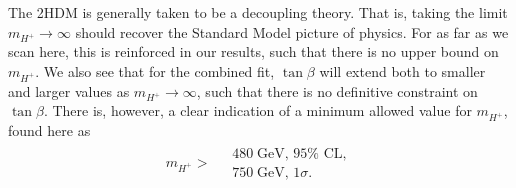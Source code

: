 \documentclass[a4paper,12pt]{article}
\begin{document}
The 2HDM is generally taken to be a decoupling theory. 
That is, taking the limit $m_{H^+} \to \infty$ should recover the Standard Model picture of physics.
For as far as we scan here, this is reinforced in our results, such that there is no upper bound on $m_{H^+}$. 
We also see that for the combined fit, $\tan\beta$ will extend both to smaller and larger values as $m_{H^+}\to\infty$, such that there is no definitive constraint on $\tan\beta$. 
There is, however, a clear indication of a minimum allowed value for $m_{H^+}$, found here as
\begin{align}
    \label{eq:const}
    m_{H^+} > \begin{split} &\; 480 \;\text{GeV},\, 95\% \text{ CL}, \\ &\; 750 \;\text{GeV},\, 1\sigma. \end{split}
\end{align}
\end{document}
